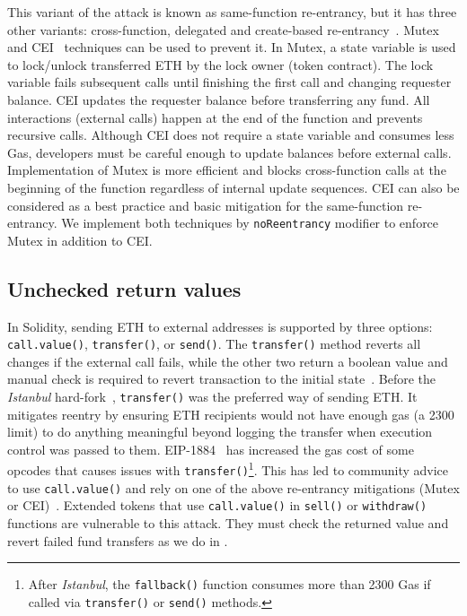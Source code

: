 This variant of the attack is known as same-function re-entrancy, but it has three other variants: cross-function, delegated and create-based re-entrancy~\cite{SEREUM}. Mutex~\cite{WiKiMutex} and CEI~\cite{SolidtyDocSec} techniques can be used to prevent it. In Mutex, a state variable is used to lock/unlock transferred ETH by the lock owner (\ie token contract). The lock variable fails subsequent calls until finishing the first call and changing requester balance. CEI updates the requester balance before transferring any fund. All interactions (\ie external calls) happen at the end of the function and prevents recursive calls. Although CEI does not require a state variable and consumes less Gas, developers must be careful enough to update balances before external calls. { \blue Implementation of Mutex is more efficient and blocks cross-function calls at the beginning of the function regardless of internal update sequences. CEI can also be considered as a best practice and basic mitigation for the same-function re-entrancy.} We implement both techniques by \texttt{noReentrancy} modifier to enforce Mutex in addition to CEI.

\subsection{Unchecked return values}
In Solidity, sending ETH to external addresses is supported by three options: \texttt{call.value()}, \texttt{transfer()}, or \texttt{send()}. The \texttt{transfer()} method reverts all changes if the external call fails, while the other two return a boolean value and manual check is required to revert transaction to the initial state~\cite{SoliditySendEther}. Before the \textit{Istanbul} hard-fork~\cite{IstanbulUpgrades}, \texttt{transfer()} was the preferred way of sending ETH. It mitigates reentry by ensuring ETH recipients would not have enough gas (\ie a 2300 limit) to do anything meaningful beyond logging the transfer when execution control was passed to them. EIP-1884~\cite{EIP1884} has increased the gas cost of some opcodes that causes issues with \texttt{transfer()}\footnote{After \textit{Istanbul}, the \texttt{fallback()} function consumes more than 2300 Gas if called via \texttt{transfer()} or \texttt{send()} methods.}. This has led to community advice to use \texttt{call.value()} and rely on one of the above re-entrancy mitigations (\ie Mutex or CEI)~\cite{ConsensysStopTran,ChainSecurity}. { \blue Extended \erc tokens that use \texttt{call.value()} in \texttt{sell()} or \texttt{withdraw()} functions are vulnerable to this attack. They must check the returned value and revert failed fund transfers as we do in \sys}.

